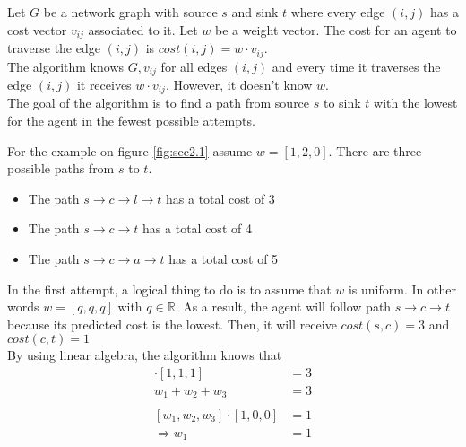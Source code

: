 Let $G$ be a network graph with source $s$ and sink $t$ where every edge $(i,j)$ has a cost vector $v_{ij}$ associated to it. Let $w$ be a weight vector. The cost for an agent to traverse the edge $(i,j)$ is $cost(i,j)=w \cdot v_{ij}$. \\

The algorithm knows $G, v_{ij}$ for all edges $(i,j)$  and every time it traverses the edge $(i,j)$ it receives $w \cdot v_{ij}$. However, it doesn't know $w$.  \\

The goal of the algorithm is to find a path from source $s$ to sink $t$ with the lowest for the agent in the fewest possible attempts.

For the example on figure \ref{fig:sec2.1} assume $w=[1,2,0]$. There are three possible paths from $s$ to $t$.
\begin{itemize}
  \item The path $s\to c \to l \to t$ has a total cost of 3
  \item The path $s\to c \to t$ has a total cost of 4
  \item The path $s\to c \to a \to t$ has a total cost of 5
\end{itemize}

In the first attempt, a logical thing to do is to assume that $w$ is uniform. In other words $w = [q,q,q]$ with $q \in \mathbb{R}$. As a result, the agent will follow path $s\to c \to t$ because its predicted cost is the lowest. Then, it will receive $cost(s,c)=3$ and $cost(c,t)=1$  \\

By using linear algebra, the algorithm knows that 
\begin{align}
  [w_1,w_2,w_3]\cdot [1,1,1] &=  3 \nonumber\\
  w_1+w_2+w_3 &=  3 \label{eqn:sec2.1}\\
  \nonumber\\
  [w_1,w_2,w_3] \cdot [1,0,0] &= 1 \nonumber\\
  \Rightarrow w_1 &=  1 \label{eqn:sec2.2}
\end{align}


